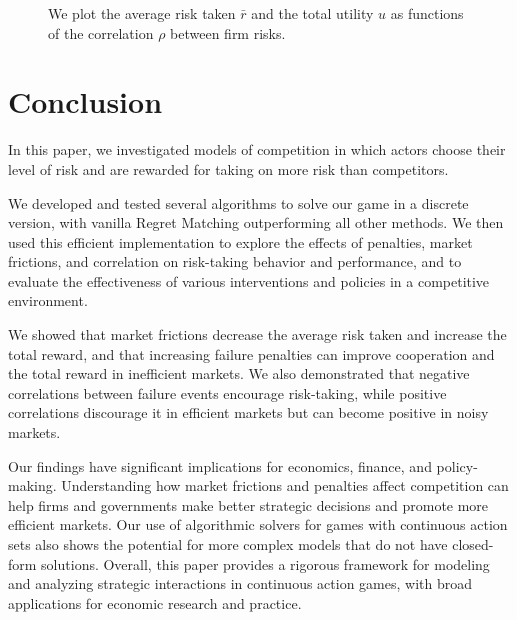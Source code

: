 \documentclass[preprint,12pt,authoryear]{elsarticle}
\theoremstyle{definition}
\begin{document}
\begin{figure}[htbp]
  \centering
  \begin{minipage}[t]{0.48\textwidth}
    \centering
    
  \end{minipage}
  \hfill
  \begin{minipage}[t]{0.48\textwidth}
    \centering
    
  \end{minipage}
  \begin{minipage}[t]{0.48\textwidth}
    \centering
    
  \end{minipage}
  \hfill
  \begin{minipage}[t]{0.48\textwidth}
    \centering
    
  \end{minipage}
  \caption{We plot the average risk taken $\bar r$ and the total utility $u$ as functions of the correlation $\rho$ between firm risks.}
  \label{fig:result-corr}  
\end{figure}

\section{Conclusion}

In this paper, we investigated models of competition in which actors choose their level of risk and are rewarded for taking on more risk than competitors.

We developed and tested several algorithms to solve our game in a discrete version, with vanilla Regret Matching outperforming all other methods. We then used this efficient implementation to explore the effects of penalties, market frictions, and correlation on risk-taking behavior and performance, and to evaluate the effectiveness of various interventions and policies in a competitive environment.

We showed that market frictions decrease the average risk taken and increase the total reward, and that increasing failure penalties can improve cooperation and the total reward in inefficient markets. We also demonstrated that negative correlations between failure events encourage risk-taking, while positive correlations discourage it in efficient markets but can become positive in noisy markets.

Our findings have significant implications for economics, finance, and policy-making. Understanding how market frictions and penalties affect competition can help firms and governments make better strategic decisions and promote more efficient markets. Our use of algorithmic solvers for games with continuous action sets also shows the potential for more complex models that do not have closed-form solutions. Overall, this paper provides a rigorous framework for modeling and analyzing strategic interactions in continuous action games, with broad applications for economic research and practice.
\end{document}
